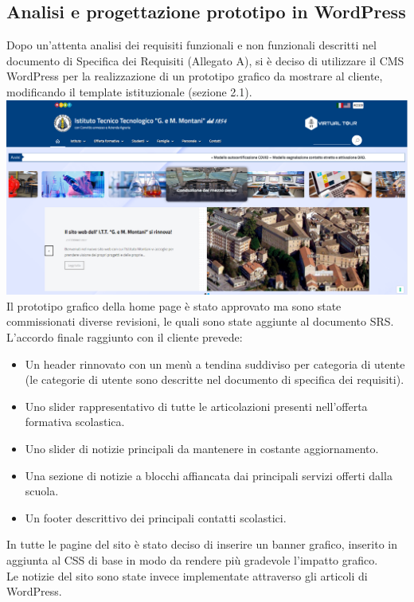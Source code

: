 \documentclass{article}
\begin{document}
	\subsection{\textbf{Analisi e progettazione prototipo in WordPress}}
	Dopo un'attenta analisi dei requisiti funzionali e non funzionali descritti nel documento di Specifica dei Requisiti (Allegato A), si è deciso di utilizzare il CMS WordPress per la realizzazione di un prototipo grafico da mostrare al cliente, modificando il template istituzionale (sezione 2.1). 
	\includegraphics[scale=0.28]{prototipo.png}
	Il prototipo grafico della home page è stato approvato ma sono state commissionati diverse revisioni, le quali sono state aggiunte al documento SRS. L'accordo finale raggiunto con il cliente prevede:
	\begin{itemize}
	    \item Un header rinnovato con un menù a tendina suddiviso per categoria di utente (le categorie di utente sono descritte nel documento di specifica dei requisiti).
	    \item Uno slider rappresentativo di tutte le articolazioni presenti nell'offerta formativa scolastica.
	    \item Uno slider di notizie principali da mantenere in costante aggiornamento.
	    \item Una sezione di notizie a blocchi affiancata dai principali servizi offerti dalla scuola.
	    \item Un footer descrittivo dei principali contatti scolastici.
	\end{itemize}
	In tutte le pagine del sito è stato deciso di inserire un banner grafico, inserito in aggiunta al CSS di base in modo da rendere più gradevole l'impatto grafico. \\
	Le notizie del sito sono state invece implementate attraverso gli articoli di WordPress.\\
	
\end{document}
